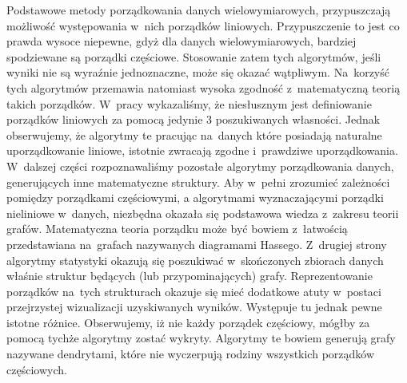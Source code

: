 \documentclass[12pt,a4paper]{report}
\begin{document}
Podstawowe metody porządkowania danych wielowymiarowych, przypuszczają możliwość występowania w~nich porządków liniowych. Przypuszczenie to jest co prawda wysoce niepewne, gdyż dla danych wielowymiarowych, bardziej spodziewane są porządki częściowe. Stosowanie zatem tych algorytmów, jeśli wyniki nie są wyraźnie jednoznaczne, może się okazać wątpliwym. Na~korzyść tych algorytmów przemawia natomiast wysoka zgodność z~matematyczną teorią takich porządków. W~pracy wykazaliśmy, że niesłusznym jest definiowanie porządków liniowych za pomocą jedynie 3 poszukiwanych własności. Jednak obserwujemy, że algorytmy te pracując na~danych które posiadają naturalne uporządkowanie liniowe, istotnie zwracają zgodne i~prawdziwe uporządkowania. W~dalszej części rozpoznawaliśmy pozostałe algorytmy porządkowania danych, generujących inne matematyczne struktury.
Aby w~pełni zrozumieć zależności pomiędzy porządkami częściowymi, a algorytmami wyznaczającymi porządki nieliniowe w~danych, niezbędna okazała się podstawowa wiedza z~zakresu teorii grafów. Matematyczna teoria porządku może być bowiem z~łatwością przedstawiana na~grafach nazywanych diagramami Hassego. Z~drugiej strony algorytmy statystyki okazują się poszukiwać w~skończonych zbiorach danych właśnie struktur będących (lub przypominających) grafy.  Reprezentowanie porządków na~tych strukturach okazuje się mieć dodatkowe atuty w~postaci przejrzystej wizualizacji uzyskiwanych wyników. Występuje tu jednak pewne istotne różnice. Obserwujemy, iż nie każdy porządek częściowy, mógłby za pomocą tychże algorytmy zostać wykryty. Algorytmy te bowiem generują grafy nazywane dendrytami, które nie wyczerpują rodziny wszystkich porządków częściowych.
\end{document}

